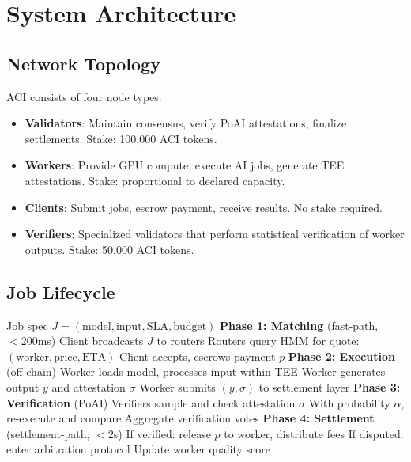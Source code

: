 \section{System Architecture}

\label{sec:architecture}

\subsection{Network Topology}

ACI consists of four node types:

\begin{definition}
\begin{itemize}[leftmargin=1.1em]
    \item \textbf{Validators}: Maintain consensus, verify PoAI attestations, finalize settlements. Stake: 100,000 ACI tokens.
    \item \textbf{Workers}: Provide GPU compute, execute AI jobs, generate TEE attestations. Stake: proportional to declared capacity.
    \item \textbf{Clients}: Submit jobs, escrow payment, receive results. No stake required.
    \item \textbf{Verifiers}: Specialized validators that perform statistical verification of worker outputs. Stake: 50,000 ACI tokens.
\end{itemize}
\end{definition}

\subsection{Job Lifecycle}

\begin{algorithm}[H]
\caption{ACI Job Lifecycle}
\label{alg:lifecycle}
\begin{algorithmic}[1]
\Require Job spec $J = (\text{model}, \text{input}, \text{SLA}, \text{budget})$
\State \textbf{Phase 1: Matching} (fast-path, $< 200$ms)
\State Client broadcasts $J$ to routers
\State Routers query HMM for quote: $(\text{worker}, \text{price}, \text{ETA})$
\State Client accepts, escrows payment $p$
\State \textbf{Phase 2: Execution} (off-chain)
\State Worker loads model, processes input within TEE
\State Worker generates output $y$ and attestation $\sigma$
\State Worker submits $(y, \sigma)$ to settlement layer
\State \textbf{Phase 3: Verification} (PoAI)
\State Verifiers sample and check attestation $\sigma$
\State With probability $\alpha$, re-execute and compare
\State Aggregate verification votes
\State \textbf{Phase 4: Settlement} (settlement-path, $< 2$s)
\State If verified: release $p$ to worker, distribute fees
\State If disputed: enter arbitration protocol
\State Update worker quality score
\end{algorithmic}
\end{algorithm}

